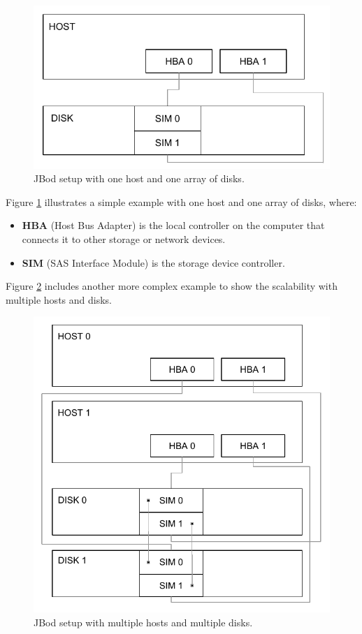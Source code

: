 \begin{figure}[h!]
	\vspace*{3mm}
	\centering
	\includegraphics[scale=1]{pdf/1host-1disk.pdf}
	\vspace*{3mm}	
	\caption[Simple JBod setup]{JBod setup with one host and one array of disks.\label{fig:1host-1disk}}
\end{figure}
\newpage

Figure \ref{fig:1host-1disk} illustrates a simple example with one host and one array of disks, where:
\begin{itemize}
	\item \textbf{HBA} (Host Bus Adapter) is the local controller on the computer that connects it to other storage or network devices.
	\item \textbf{SIM} (SAS Interface Module) is the storage device controller.
\end{itemize}

Figure \ref{fig:2host-2disk} includes another more complex example to show the scalability with multiple hosts and disks.
\begin{figure}[h!]
	\centering
	\includegraphics[scale=1]{pdf/2host-2disk.pdf}
	\caption[Complex JBod setup]{JBod setup with multiple hosts and multiple disks. \label{fig:2host-2disk}}
\end{figure}

